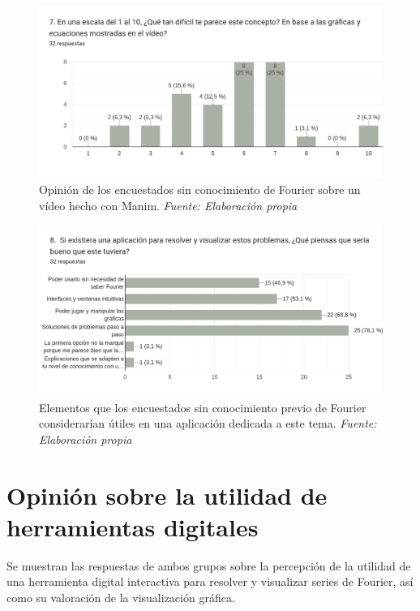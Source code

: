 \begin{figure}[H]
	\centering
	\includegraphics[width=1\textwidth]{img/appendixA/7_dificultad_video_Foruier.png}
	\caption[Opinión de los encuestados sin conocimiento de Fourier sobre un vídeo hecho con Manim.]{Opinión de los encuestados sin conocimiento de Fourier sobre un vídeo hecho con Manim. \textit{Fuente: Elaboración propia}}
	\label{fig:app1_dificultad_video_Foruier}  %
\end{figure}

\begin{figure}[H]
	\centering
	\includegraphics[width=1\textwidth]{img/appendixA/8_cosas_deberie_tener.png}
	\caption[Elementos que los encuestados sin conocimiento previo de Fourier considerarían útiles en una aplicación dedicada a este tema.]{Elementos que los encuestados sin conocimiento previo de Fourier considerarían útiles en una aplicación dedicada a este tema. \textit{Fuente: Elaboración propia}}
	\label{fig:app1_cosas_deberie_tener}  %
\end{figure}


\newpage
\section{Opinión sobre la utilidad de herramientas digitales}
Se muestran las respuestas de ambos grupos sobre la percepción de la utilidad de una herramienta digital interactiva para resolver y visualizar series de Fourier, así como su valoración de la visualización gráfica.


